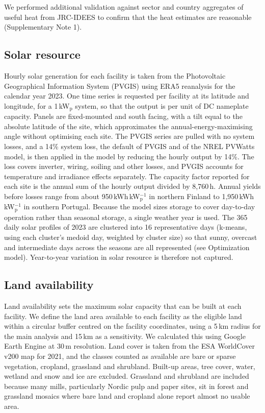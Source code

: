\documentclass[11pt]{article}
\begin{document}
We performed additional validation against sector and country aggregates of useful heat from JRC-IDEES\cite{jrcidees2023} to confirm that the heat estimates are reasonable (Supplementary Note 1).

\subsection*{Solar resource}
Hourly solar generation for each facility is taken from the Photovoltaic Geographical Information System (PVGIS)\cite{huld2012pvgis} using ERA5 reanalysis\cite{hersbach2020era5} for the calendar year 2023. One time series is requested per facility at its latitude and longitude, for a 1\,kW$_\mathrm{p}$ system, so that the output is per unit of DC nameplate capacity. Panels are fixed-mounted and south facing, with a tilt equal to the absolute latitude of the site, which approximates the annual-energy-maximising angle without optimising each site. The PVGIS series are pulled with no system losses, and a 14\% system loss, the default of PVGIS and of the NREL PVWatts model\cite{dobos2014}, is then applied in the model by reducing the hourly output by 14\%. The loss covers inverter, wiring, soiling and other losses, and PVGIS accounts for temperature and irradiance effects separately. The capacity factor reported for each site is the annual sum of the hourly output divided by 8,760\,h. Annual yields before losses range from about 950\,kWh\,kW$_\mathrm{p}^{-1}$ in northern Finland to 1,950\,kWh\,kW$_\mathrm{p}^{-1}$ in southern Portugal. Because the model sizes storage to cover day-to-day operation rather than seasonal storage, a single weather year is used. The 365 daily solar profiles of 2023 are clustered into 16 representative days (k-means, using each cluster's medoid day, weighted by cluster size) so that sunny, overcast and intermediate days across the seasons are all represented (see Optimization model). Year-to-year variation in solar resource is therefore not captured.

\subsection*{Land availability}
Land availability sets the maximum solar capacity that can be built at each facility. We define the land area available to each facility as the eligible land within a circular buffer centred on the facility coordinates, using a 5\,km radius for the main analysis and 15\,km as a sensitivity. We calculated this using Google Earth Engine at 30\,m resolution. Land cover is taken from the ESA WorldCover v200 map for 2021\cite{zanaga2022worldcover}, and the classes counted as available are bare or sparse vegetation, cropland, grassland and shrubland. Built-up areas, tree cover, water, wetland and snow and ice are excluded. Grassland and shrubland are included because many mills, particularly Nordic pulp and paper sites, sit in forest and grassland mosaics where bare land and cropland alone report almost no usable area.
\end{document}
